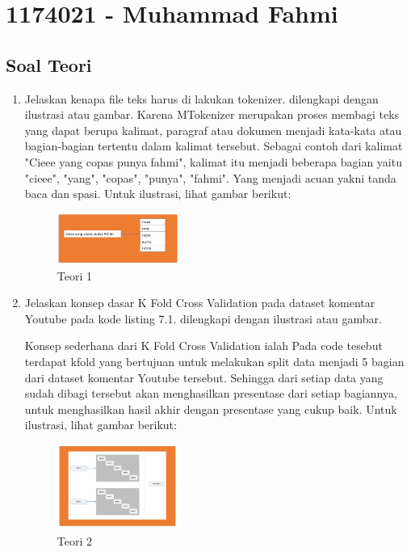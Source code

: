 \section{1174021 - Muhammad Fahmi}
\subsection{Soal Teori}
\begin{enumerate}

	\item Jelaskan kenapa file teks harus di lakukan tokenizer. dilengkapi dengan ilustrasi atau gambar.
	\hfill\break
	Karena MTokenizer merupakan proses membagi teks yang dapat berupa kalimat, paragraf atau dokumen menjadi kata-kata atau bagian-bagian tertentu dalam kalimat tersebut. Sebagai contoh dari kalimat "Cieee yang copas punya fahmi", kalimat itu menjadi beberapa bagian yaitu "cieee", "yang", "copas", "punya", "fahmi". Yang menjadi acuan yakni tanda baca dan spasi. Untuk ilustrasi, lihat gambar berikut: 

	\begin{figure}[H]
	\centering
		\includegraphics[width=4cm]{figures/1174021/tugas7/materi/teori1.PNG}
		\caption{Teori 1}
	\end{figure}

	\item Jelaskan konsep dasar K Fold Cross Validation pada dataset komentar Youtube pada kode listing 7.1. dilengkapi dengan ilustrasi atau gambar.

	

	\hfill\break
	Konsep sederhana dari K Fold Cross Validation ialah Pada code tesebut terdapat kfold yang bertujuan untuk melakukan split data menjadi 5 bagian dari dataset komentar Youtube tersebut. Sehingga dari setiap data yang sudah dibagi tersebut akan menghasilkan presentase dari setiap bagiannya, untuk menghasilkan hasil akhir dengan presentase yang cukup baik. Untuk ilustrasi, lihat gambar berikut: 

	\begin{figure}[H]
	\centering
		\includegraphics[width=4cm]{figures/1174021/tugas7/materi/teori2.PNG}
		\caption{Teori 2}
	\end{figure}
	

\end{enumerate}
